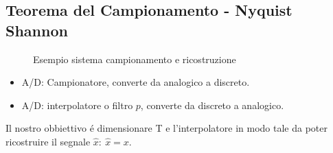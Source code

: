     \subsection{Teorema del Campionamento - Nyquist Shannon}
        \begin{figure}[H]
            \centering
            \label{fig:Sistema di campionamento e ricostruzione}
            \caption{Esempio sistema campionamento e ricostruzione}
        \end{figure}
        \begin{itemize}
            \item {
                A/D: Campionatore, converte da analogico a discreto.
            }
            \item {
                A/D: interpolatore o filtro $p$, converte da discreto a analogico.
            }
        \end{itemize}
        Il nostro obbiettivo é dimensionare T e l'interpolatore in modo tale da poter ricostruire il segnale $\hat{x}:\ \hat{x} =x$.
